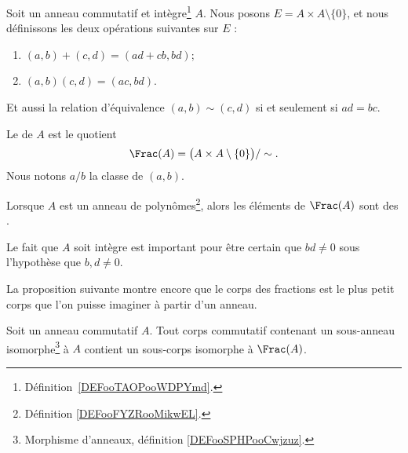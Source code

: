 \begin{definition}       \label{DEFooGJYXooOiJQvP}
	Soit un anneau commutatif et intègre\footnote{Définition~\ref{DEFooTAOPooWDPYmd}.} \( A\). Nous posons \( E=A\times A\setminus\{ 0 \}\), et nous définissons les deux opérations suivantes sur \( E\) :
	\begin{enumerate}
		\item       \label{ITEMooWBWHooYsXFkO}
		      \( (a,b)+(c,d)=(ad+cb,bd)\);
		\item       \label{ITEMooGOOIooCHqLRl}
		      \( (a,b)(c,d)=(ac,bd)\).
	\end{enumerate}
	Et aussi la relation d'équivalence \( (a,b)\sim(c,d)\) si et seulement si \( ad=bc\).

	Le  de \( A\) est le quotient
	\begin{equation}
		\Frac(A)=\big( A\times A\setminus\{ 0 \} \big)/\sim.
	\end{equation}
	Nous notons \( a/b\) la classe de \( (a,b)\).

	Lorsque \( A\) est un anneau de polynômes\footnote{Définition \ref{DEFooFYZRooMikwEL}.}, alors les éléments de \( \Frac(A)\) sont des .
\end{definition}
Le fait que \( A\) soit intègre est important pour être certain que \( bd\neq 0\) sous l'hypothèse que \( b,d\neq 0\).

La proposition suivante montre encore que le corps des fractions est le plus petit corps que l'on puisse imaginer à partir d'un anneau.
\begin{proposition}       \label{PROPooIJBEooDjsoHr}
	Soit un anneau commutatif \( A\). Tout corps commutatif contenant un sous-anneau isomorphe\footnote{Morphisme d'anneaux, définition \ref{DEFooSPHPooCwjzuz}.} à \( A\) contient un sous-corps isomorphe à \( \Frac(A)\).
\end{proposition}


